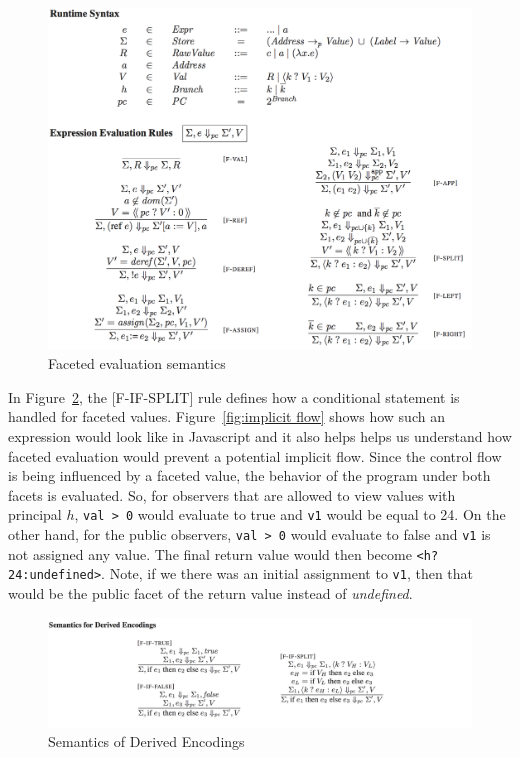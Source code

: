 \begin{figure}
	\centering
	\includegraphics[scale=0.25, frame]{images/facetEval.png}
	\caption{Faceted evaluation semantics~\cite{FacetedJeeves}}
	\label{fig:facetEval}
\end{figure}

In Figure~\ref{fig:fif}, the [F-IF-SPLIT] rule defines how a conditional statement
is handled for faceted values. Figure~\ref{fig:implicit flow} shows how such an
expression would look like in Javascript and it also helps helps us understand
how faceted evaluation would prevent a potential implicit flow. Since the control
flow is being influenced by a faceted value, the behavior of the program under both
facets is evaluated. So, for observers that are allowed to view values with principal
$h$, \texttt{val > 0} would evaluate to true and \texttt{v1} would be equal to 24.
On the other hand, for the public observers, \texttt{val > 0} would evaluate to
false and \texttt{v1} is not assigned any value. The final return value would then
become \texttt{<h?24:undefined>}. Note, if we there was an initial assignment to
\texttt{v1}, then that would be the public facet of the return value instead of
\textit{undefined}.

\begin{figure}
	\centering
	\includegraphics[scale=0.275, frame]{images/fif.png}
	\caption{Semantics of Derived Encodings~\cite{FacetedJeeves}}
	\label{fig:fif}
\end{figure}


